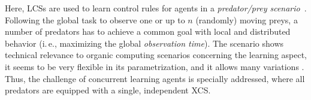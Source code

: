 Here, LCSs are used to learn control rules for agents in a \emph{predator/prey scenario}~\cite{BJD86}. Following the global task to observe one or up to $n$ (randomly) moving preys, a number of predators has %
to achieve a common goal with local and distributed behavior (i.\,e., maximizing the global \emph{observation time}). The scenario shows technical relevance to organic computing scenarios concerning the learning aspect, it seems to be very flexible in its parametrization, and it allows many variations \cite{SV00}. %
Thus, the challenge of concurrent learning agents is specially addressed, where all predators are equipped with a single, independent XCS.
